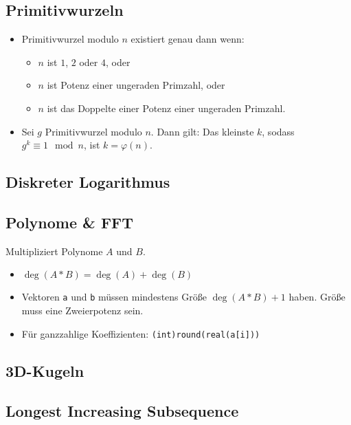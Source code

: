 \subsection{Primitivwurzeln}
\begin{itemize}[nosep]
	\item Primitivwurzel modulo $n$ existiert genau dann wenn:
	\begin{itemize}[nosep]
		\item $n$ ist $1$, $2$ oder $4$, oder
		\item $n$ ist Potenz einer ungeraden Primzahl, oder
		\item $n$ ist das Doppelte einer Potenz einer ungeraden Primzahl.
	\end{itemize}

	\item Sei $g$ Primitivwurzel modulo $n$.
	Dann gilt:\newline
	Das kleinste $k$, sodass $g^k \equiv 1 \mod n$, ist $k = \varphi(n)$.
\end{itemize}


\subsection{Diskreter Logarithmus}


\subsection{Polynome \& FFT}
Multipliziert Polynome $A$ und $B$.
\begin{itemize}[nosep]
	\item $\deg(A * B) = \deg(A) + \deg(B)$
	\item Vektoren \lstinline{a} und \lstinline{b} müssen mindestens Größe
	$\deg(A * B) + 1$ haben.
	Größe muss eine Zweierpotenz sein.
	\item Für ganzzahlige Koeffizienten: \lstinline{(int)round(real(a[i]))}
\end{itemize}


\subsection{3D-Kugeln}


\subsection{Longest Increasing Subsequence}


